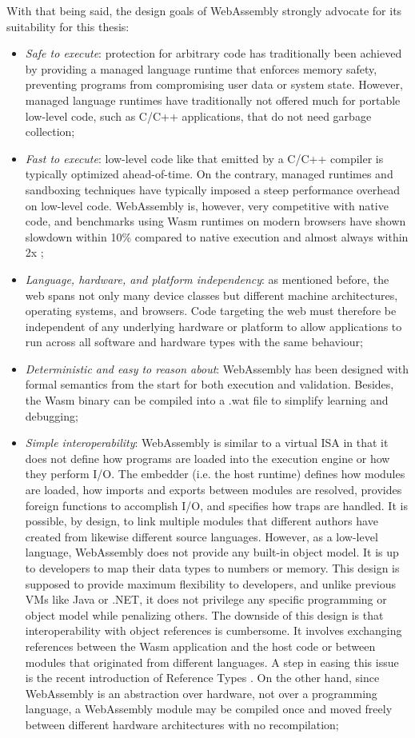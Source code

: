 With that being said, the design goals of WebAssembly strongly advocate for its suitability for this thesis:

\begin{itemize}
    \item \emph{Safe to execute}: protection for arbitrary code has traditionally been achieved by providing a managed language runtime that enforces memory safety, preventing programs from compromising user data or system state. However, managed language runtimes have traditionally not offered much for portable low-level code, such as C/C++ applications, that do not need garbage collection;
    \item \emph{Fast to execute}: low-level code like that emitted by a C/C++ compiler is typically optimized ahead-of-time. On the contrary, managed runtimes and sandboxing techniques have typically imposed a steep performance overhead on low-level code. WebAssembly is, however, very competitive with native code, and benchmarks using Wasm runtimes on modern browsers have shown slowdown within 10\% compared to native execution and almost always within 2x \cite{haas2017bringing};
    \item \emph{Language, hardware, and platform independency}: as mentioned before, the web spans not only many device classes but different machine architectures, operating systems, and browsers. Code targeting the web must therefore be independent of any underlying hardware or platform to allow applications to run across all software and hardware types with the same behaviour;
    \item \emph{Deterministic and easy to reason about}: WebAssembly has been designed with formal semantics from the start for both execution and validation. Besides, the Wasm binary can be compiled into a .wat file to simplify learning and debugging;
    \item \emph{Simple interoperability}: WebAssembly is similar to a virtual ISA in that it does not define how programs are loaded into the execution engine or how they perform I/O. The embedder (i.e. the host runtime) defines how modules are loaded, how imports and exports between modules are resolved, provides foreign functions to accomplish I/O, and specifies how traps are handled. It is possible, by design, to link multiple modules that different authors have created from likewise different source languages. However, as a low-level language, WebAssembly does not provide any built-in object model. It is up to developers to map their data types to numbers or memory. This design is supposed to provide maximum flexibility to developers, and unlike previous VMs like Java or .NET, it does not privilege any specific programming or object model while penalizing others. The downside of this design is that interoperability with object references is cumbersome. It involves exchanging references between the Wasm application and the host code or between modules that originated from different languages. A step in easing this issue is the recent introduction of Reference Types \cite{reference-types}. On the other hand, since WebAssembly is an abstraction over hardware, not over a programming language, a WebAssembly module may be compiled once and moved freely between different hardware architectures with no recompilation;

\end{itemize}
